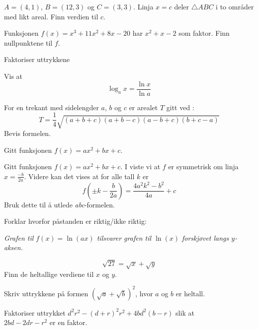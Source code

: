 $A=(4, 1)$, $B=(12, 3)$ og $C=(3, 3)$. Linja $x=c$ deler $\triangle ABC$ i to områder med likt areal. Finn verdien til $c$.

Funksjonen $f(x)=x^3+11x^2+8x-20$ har $x^2+x-2$ som faktor. Finn nullpunktene til $f$.

Faktoriser uttrykkene 

Vis at
\[ \log_{a} x = \frac{\ln x}{\ln a} \]


For en trekant med sidelengder $ a $, $ b $ og $ c $ er arealet $ T $ gitt ved :
\[ T=\frac{1}{4}\sqrt{(a+b+c)(a+b-c)(a-b+c)(b+c-a)} \]
Bevis formelen.

Gitt funksjonen $f(x)=ax^2+bx+c$. 

Gitt funksjonen $ f(x)=ax^2+bx+c $. I  viste vi at $ f $ er symmetrisk om linja $ x=\frac{-b}{2a} $. Videre kan det vises at for alle tall $ k $ er
\[ f\left(\pm k-\frac{b}{2a}\right)=\frac{4a^2k^2-b^2}{4a}+c \]
Bruk dette til å utlede \textit{abc}-formelen.


Forklar hvorfor påstanden er riktig/ikke riktig: \os

\textsl{Grafen til $f(x)=\ln(ax)$ tilsvarer grafen til $\ln(x)$ forskjøvet langs $y$-aksen.
}


 \vs
\[ \sqrt{27}=\sqrt{x}+\sqrt{y} \]
Finn de heltallige verdiene til $ x $ og $ y $.



Skriv uttrykkene på formen $ \left(\sqrt{a}+\sqrt{b}\right)^2 $, hvor $ a $ og $ b $ er heltall.\os
{}

 \vs
{}
Faktoriser uttrykket $ d^2  r^2-(d+r)^2  r^2+4b d^2 (b-r) $ slik at\\ $ 2bd-2dr-r^2 $ er en faktor.


